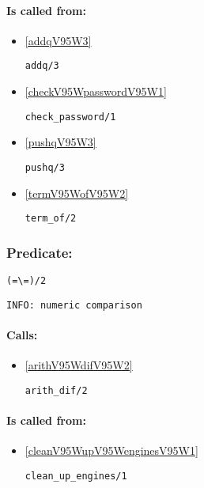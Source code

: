 \paragraph{Is called from:} 
\begin{itemize}
\item \ref{addqV95W3} 
\begin{verbatim}
addq/3
\end{verbatim}

\item \ref{checkV95WpasswordV95W1} 
\begin{verbatim}
check_password/1
\end{verbatim}

\item \ref{pushqV95W3} 
\begin{verbatim}
pushq/3
\end{verbatim}

\item \ref{termV95WofV95W2} 
\begin{verbatim}
term_of/2
\end{verbatim}

\end{itemize}

\subsubsection{Predicate:} \label{V61WV92WV61WV95W2}

\begin{verbatim}
(=\=)/2
\end{verbatim}

{\small \begin{verbatim}
INFO: numeric comparison

\end{verbatim}}
\paragraph{Calls:} 
\begin{itemize}
\item \ref{arithV95WdifV95W2} 
\begin{verbatim}
arith_dif/2
\end{verbatim}

\end{itemize}
\paragraph{Is called from:} 
\begin{itemize}
\item \ref{cleanV95WupV95WenginesV95W1} 
\begin{verbatim}
clean_up_engines/1
\end{verbatim}

\end{itemize}


